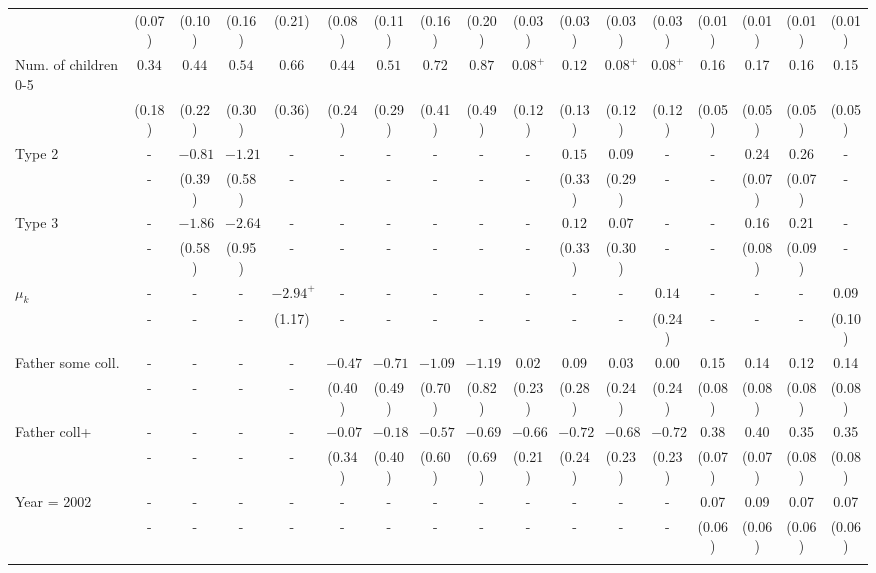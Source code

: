 \begin{tabular}{lcccccccccccccccc}
&(0.07)&(0.10)&(0.16)&(0.21)&(0.08)&(0.11)&(0.16)&(0.20)&(0.03)&(0.03)&(0.03)&(0.03)&(0.01)&(0.01)&(0.01)&(0.01)\\
Num. of children 0-5&$0.34$&$0.44$&$0.54$&$0.66$&$0.44$&$0.51$&$0.72$&$0.87$&$0.08^{+}$&$0.12$&$0.08^{+}$&$0.08^{+}$&0.16&0.17&0.16&0.15\\
&(0.18)&(0.22)&(0.30)&(0.36)&(0.24)&(0.29)&(0.41)&(0.49)&(0.12)&(0.13)&(0.12)&(0.12)&(0.05)&(0.05)&(0.05)&(0.05)\\
Type 2&-&$-0.81$&$-1.21$&-&-&-&-&-&-&$0.15$&$0.09$&-&-&0.24&0.26&-\\
&-&(0.39)&(0.58)&-&-&-&-&-&-&(0.33)&(0.29)&-&-&(0.07)&(0.07)&-\\
Type 3&-&$-1.86$&$-2.64$&-&-&-&-&-&-&$0.12$&$0.07$&-&-&0.16&0.21&-\\
&-&(0.58)&(0.95)&-&-&-&-&-&-&(0.33)&(0.30)&-&-&(0.08)&(0.09)&-\\
$\mu_{k}$&-&-&-&$-2.94^{+}$&-&-&-&-&-&-&-&$0.14$&-&-&-&0.09\\
&-&-&-&(1.17)&-&-&-&-&-&-&-&(0.24)&-&-&-&(0.10)\\
Father some coll.&-&-&-&-&$-0.47$&$-0.71$&$-1.09$&$-1.19$&$0.02$&$0.09$&$0.03$&$0.00$&0.15&0.14&0.12&0.14\\
&-&-&-&-&(0.40)&(0.49)&(0.70)&(0.82)&(0.23)&(0.28)&(0.24)&(0.24)&(0.08)&(0.08)&(0.08)&(0.08)\\
Father coll+&-&-&-&-&$-0.07$&$-0.18$&$-0.57$&$-0.69$&$-0.66$&$-0.72$&$-0.68$&$-0.72$&0.38&0.40&0.35&0.35\\
&-&-&-&-&(0.34)&(0.40)&(0.60)&(0.69)&(0.21)&(0.24)&(0.23)&(0.23)&(0.07)&(0.07)&(0.08)&(0.08)\\
Year = 2002&-&-&-&-&-&-&-&-&-&-&-&-&0.07&0.09&0.07&0.07\\
&-&-&-&-&-&-&-&-&-&-&-&-&(0.06)&(0.06)&(0.06)&(0.06)\\
\\
\bottomrule\end{tabular}